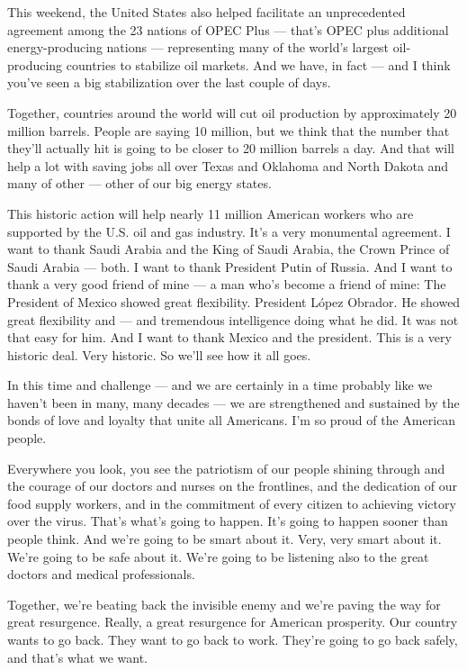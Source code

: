 This weekend, the United States also helped facilitate an unprecedented
agreement among the 23 nations of OPEC Plus --- that's OPEC plus
additional energy-producing nations --- representing many of the world's
largest oil-producing countries to stabilize oil markets. And we have,
in fact --- and I think you've seen a big stabilization over the last
couple of days.

Together, countries around the world will cut oil production by
approximately 20 million barrels. People are saying 10 million, but we
think that the number that they'll actually hit is going to be closer to
20 million barrels a day. And that will help a lot with saving jobs all
over Texas and Oklahoma and North Dakota and many of other --- other of
our big energy states.

This historic action will help nearly 11 million American workers who
are supported by the U.S. oil and gas industry. It's a very monumental
agreement. I want to thank Saudi Arabia and the King of Saudi Arabia,
the Crown Prince of Saudi Arabia --- both. I want to thank President
Putin of Russia. And I want to thank a very good friend of mine --- a
man who's become a friend of mine: The President of Mexico showed great
flexibility. President López Obrador. He showed great flexibility and
--- and tremendous intelligence doing what he did. It was not that easy
for him. And I want to thank Mexico and the president. This is a very
historic deal. Very historic. So we'll see how it all goes.

In this time and challenge --- and we are certainly in a time probably
like we haven't been in many, many decades --- we are strengthened and
sustained by the bonds of love and loyalty that unite all Americans. I'm
so proud of the American people.

Everywhere you look, you see the patriotism of our people shining
through and the courage of our doctors and nurses on the frontlines, and
the dedication of our food supply workers, and in the commitment of
every citizen to achieving victory over the virus. That's what's going
to happen. It's going to happen sooner than people think. And we're
going to be smart about it. Very, very smart about it. We're going to be
safe about it. We're going to be listening also to the great doctors and
medical professionals.

Together, we're beating back the invisible enemy and we're paving the
way for great resurgence. Really, a great resurgence for American
prosperity. Our country wants to go back. They want to go back to work.
They're going to go back safely, and that's what we want.

